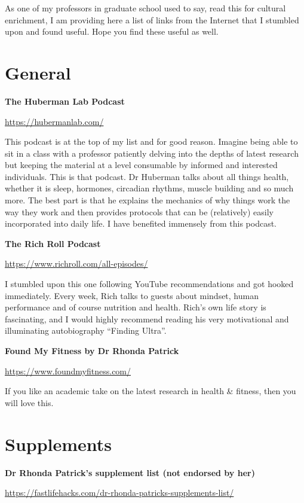 \documentclass[
  oneside]{book}
\begin{document}
As one of my professors in graduate school used to say, read this for cultural enrichment, I am providing here a list of links from the Internet that I stumbled upon and found useful. Hope you find these useful as well.

\hypertarget{general}{%
\section{General}\label{general}}

\textbf{The Huberman Lab Podcast}

\url{https://hubermanlab.com/}

This podcast is at the top of my list and for good reason. Imagine being able to sit in a class with a professor patiently delving into the depths of latest research but keeping the material at a level consumable by informed and interested individuals. This is that podcast. Dr Huberman talks about all things health, whether it is sleep, hormones, circadian rhythms, muscle building and so much more. The best part is that he explains the mechanics of why things work the way they work and then provides protocols that can be (relatively) easily incorporated into daily life. I have benefited immensely from this podcast.

\textbf{The Rich Roll Podcast}

\url{https://www.richroll.com/all-episodes/}

I stumbled upon this one following YouTube recommendations and got hooked immediately. Every week, Rich talks to guests about mindset, human performance and of course nutrition and health. Rich's own life story is fascinating, and I would highly recommend reading his very motivational and illuminating autobiography ``Finding Ultra''.

\textbf{Found My Fitness by Dr Rhonda Patrick}

\url{https://www.foundmyfitness.com/}

If you like an academic take on the latest research in health \& fitness, then you will love this.

\hypertarget{supplements}{%
\section{Supplements}\label{supplements}}

\textbf{Dr Rhonda Patrick's supplement list (not endorsed by her)}

\url{https://fastlifehacks.com/dr-rhonda-patricks-supplements-list/}
\end{document}
